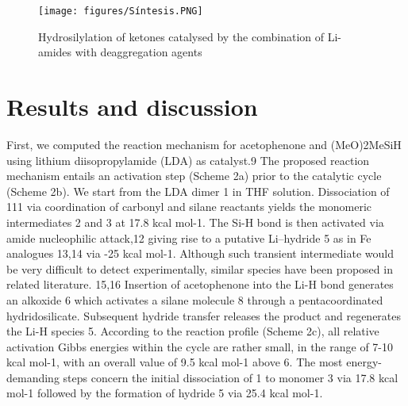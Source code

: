 \documentclass[journal=jacsat,manuscript=article]{achemso}
\begin{document}
\renewcommand{\figurename}{Scheme}

	\begin{figure}[h]
	\texttt{[image: figures/Síntesis.PNG]}
	\centering
	\caption{Hydrosilylation of ketones catalysed by the combination of	Li-amides with deaggregation agents}
	\label{Scheme1}
	\end{figure}	

	
	\section{Results and discussion}
	First, we computed the reaction mechanism for acetophenone and (MeO)2MeSiH using lithium diisopropylamide (LDA) as catalyst.9 The proposed reaction mechanism entails an activation step (Scheme 2a) prior to the catalytic cycle (Scheme 2b). We start from the LDA dimer 1 in THF solution. Dissociation of 111 via coordination of carbonyl and silane reactants yields the monomeric intermediates 2 and 3 at 17.8 kcal mol-1. The Si-H bond is then activated via amide nucleophilic attack,12 giving rise to a putative Li–hydride 5 as in Fe analogues 13,14 via -25 kcal mol-1. Although such transient intermediate would be very difficult to detect experimentally, similar species have been proposed in related literature. 15,16 Insertion of acetophenone into the Li-H bond generates an alkoxide 6 which activates a silane molecule 8 through a pentacoordinated hydridosilicate. Subsequent	hydride transfer releases the product and regenerates the Li-H species 5. According to the reaction profile (Scheme 2c), all relative activation Gibbs energies within the cycle are rather small, in the range of 7-10 kcal mol-1, with an overall value of 9.5 kcal mol-1 above 6. The most energy-demanding steps concern the initial dissociation of 1 to monomer 3 via 17.8 kcal mol-1 followed by the formation of hydride 5 via 25.4 kcal mol-1.
	
\end{document}
